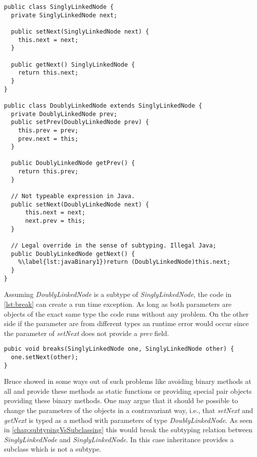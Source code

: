 \begin{lstlisting}[caption={Illegal subtyping of binary methods in Java},label={lst:javaBinary}]
public class SinglyLinkedNode {
  private SinglyLinkedNode next;

  public setNext(SinglyLinkedNode next) {
    this.next = next;
  }

  public getNext() SinglyLinkedNode {
    return this.next;
  }
}

public class DoublyLinkedNode extends SinglyLinkedNode {
  private DoublyLinkedNode prev;
  public setPrev(DoublyLinkedNode prev) {
    this.prev = prev;
    prev.next = this;
  }

  public DoublyLinkedNode getPrev() {
    return this.prev;
  }
  
  // Not typeable expression in Java.
  public setNext(DoublyLinkedNode next) {
      this.next = next;
      next.prev = this;
  }

  // Legal override in the sense of subtyping. Illegal Java;
  public DoublyLinkedNode getNext() {
    %\label{lst:javaBinary1})return (DoublyLinkedNode)this.next;
  }
}
\end{lstlisting}

Assuming \emph{DoublyLinkedNode} is a subtype of \emph{SinglyLinkedNode},
the code in \autoref{lst:break} can create a run time exception. As
long as both parameters are objects of the exact same type the code runs
without any problem. On the other side if the parameter are from different
types an runtime error would occur since the parameter of \emph{setNext}
does not provide a \emph{prev} field.

\begin{lstlisting}[label={lst:break},caption={Breaking a doubly linked node}]
pubic void breaks(SinglyLinkedNode one, SinglyLinkedNode other) {
  one.setNext(other);
}
\end{lstlisting}

Bruce showed in \cite{bruce_binary_1995} some ways out of such problems
like avoiding binary methods at all and provide these methods as static
functions or providing special pair objects providing these binary
methods. One may argue that it should be possible to change the parameters
of the objects in a contravariant way, i.e., that \emph{setNext}
and \emph{getNext} is typed as a method with parameters of type
\emph{DoublyLinkedNode}. As seen in \autoref{chap:subtypingVsSubclassing}
this would break the subtyping relation between \emph{SinglyLinkedNode}
and \emph{SinglyLinkedNode}. In this case inheritance provides a subclass
which is not a subtype.

